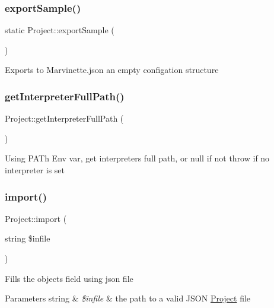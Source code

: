 \subsubsection{\texorpdfstring{export\+Sample()}{exportSample()}}
{\footnotesize\ttfamily static Project\+::export\+Sample (\begin{DoxyParamCaption}{ }\end{DoxyParamCaption})\hspace{0.3cm}{\ttfamily [static]}}

Exports to Marvinette.\+json an empty configation structure \mbox{\label{classProject_ab08a24e761958ef13b631cb5155286ad}} 
\subsubsection{\texorpdfstring{get\+Interpreter\+Full\+Path()}{getInterpreterFullPath()}}
{\footnotesize\ttfamily Project\+::get\+Interpreter\+Full\+Path (\begin{DoxyParamCaption}{ }\end{DoxyParamCaption})}

Using P\+A\+Th Env var, get interpreter\textquotesingle{}s full path, or null if not throw if no interpreter is set \mbox{\label{classProject_a726e3f6542b4b4a15c8c73f92fa84b5a}} 
\subsubsection{\texorpdfstring{import()}{import()}}
{\footnotesize\ttfamily Project\+::import (\begin{DoxyParamCaption}\item[{string}]{\$infile }\end{DoxyParamCaption})}

Fills the object\textquotesingle{}s field using json file 
\begin{DoxyParams}[1]{Parameters}
string & {\em \$infile} & the path to a valid J\+S\+ON \hyperlink{classProject}{Project} file \\
\hline
\end{DoxyParams}
\mbox{\label{classProject_a96804c40f63ec38018f480c73a7c20a8}} 
